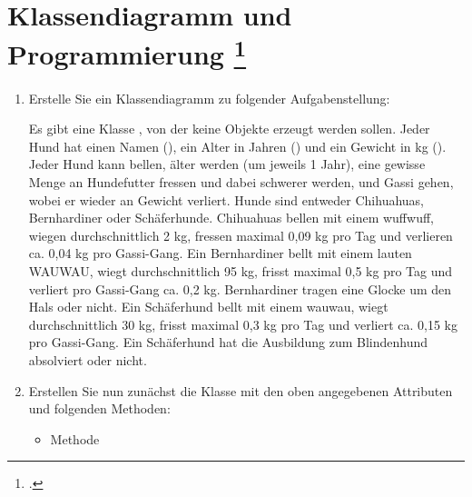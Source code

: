 \documentclass{bschlangaul-aufgabe}
\begin{document}

\let\j=\bJavaCode

\section{Klassendiagramm und Programmierung
\footcite[Aufgabe 15]{aud:pu:7}}
\begin{enumerate}


\item Erstelle Sie ein Klassendiagramm zu folgender Aufgabenstellung:

Es gibt eine Klasse \j{Hund}, von der keine Objekte erzeugt werden
sollen. Jeder Hund hat einen Namen (\j{String}), ein Alter in Jahren
(\j{int}) und ein Gewicht in kg (\j{double}). Jeder Hund kann bellen,
älter werden (um jeweils 1 Jahr), eine gewisse Menge an Hundefutter
fressen und dabei schwerer werden, und Gassi gehen, wobei er wieder an
Gewicht verliert. Hunde sind entweder Chihuahuas, Bernhardiner oder
Schäferhunde. Chihuahuas bellen mit einem wuffwuff, wiegen
durchschnittlich 2 kg, fressen maximal 0,09 kg pro Tag und verlieren ca.
0,04 kg pro Gassi-Gang. Ein Bernhardiner bellt mit einem lauten WAUWAU,
wiegt durchschnittlich 95 kg, frisst maximal 0,5 kg pro Tag und verliert
pro Gassi-Gang ca. 0,2 kg. Bernhardiner tragen eine Glocke um den Hals
oder nicht. Ein Schäferhund bellt mit einem wauwau, wiegt
durchschnittlich 30 kg, frisst maximal 0,3 kg pro Tag und verliert ca.
0,15 kg pro Gassi-Gang. Ein Schäferhund hat die Ausbildung zum
Blindenhund absolviert oder nicht.


\item Erstellen Sie nun zunächst die Klasse \j{Hund} mit den oben
angegebenen Attributen und folgenden Methoden:

\begin{itemize}
\item Methode \j{bellen();}


\end{itemize}
\end{enumerate}
\end{document}
